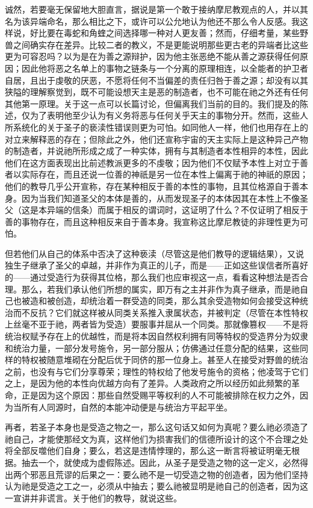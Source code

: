诚然，若要毫无保留地大胆直言，据说是第一个敢于接纳摩尼教观点的人，并以其名为该异端命名，那么相比之下，或许可以公允地认为他还不那么令人反感。我这样说，好比要在毒蛇和角蝰之间选择哪一种对人更友善；然而，仔细考量，某些野兽之间确实存在差异。比较二者的教义，不是更能说明那些更古老的异端者比这些更为可容忍吗？以为是在为善之源辩护，因为他主张恶绝不能从善之源获得任何原因；因此他将恶之名单上的事物之链条与一个分离的原理相连，以全能者的护卫者自居，且出于虔敬的厌恶，不愿将任何不当偏差的责任归咎于善之源；却没有以其狭隘的理解察觉到，既不可能设想天主是恶的制造者，也不可能在祂之外还有任何其他第一原理。关于这一点可以长篇讨论，但偏离我们当前的目的。我们提及的陈述，仅为了表明他至少认为有义务将恶与任何关乎天主的事物分开。然而，这些人所系统化的关于圣子的亵渎性错误则更为可怕。如同他人一样，他们也用存在上的对立来解释恶的存在；但除此之外，他们还宣称宇宙的天主实际上是这种异己产物的制造者，并说祂所形成之成了一种实体，拥有与其制造者本性相异的本性，因此他们在这方面表现出比前述教派更多的不虔敬；因为他们不仅赋予本性上对立于善者以实际存在，而且还说一位善的神祇是另一位在本性上偏离于祂的神祇的原因；他们的教导几乎公开宣称，存在某种相反于善的本性的事物，且其位格源自于善本身。因为当我们知道圣父的本体是善的，从而发现圣子的本体因其在本性上不像圣父（这是本异端的信条）而属于相反的谓词时，这证明了什么？不仅证明了相反于善的事物存在，而且这种相反来自于善本身。我宣称这比摩尼教徒的非理性更为可怕。\par

但若他们从自己的体系中否决了这种亵渎（尽管这是他们教导的逻辑结果），又说独生子继承了圣父的卓越，并非作为真正的儿子，而是——正如这些误信者所喜好的——通过受造行为获得其位格，那么我们也应审视这一点，看看这种想法是否合理。那么，若我们承认他们所想的属实，即万有之主并非作为真子继承，而是祂自己也被造和被创造，却统治着一群受造的同类，那么其余受造物如何会接受这种统治而不反抗？它们就这样被从同类关系推入隶属状态，并被判定（尽管在本性特权上丝毫不亚于祂，两者皆为受造）要服事并屈从一个同类。那就像篡权——不是将统治权赋予存在上的优越性，而是将本因自然权利拥有同等特权的受造界分为奴隶和统治力量，一部分发号施令，另一部分服从；仿佛通过任意分配的结果，这些同样的特权被随意堆砌在分配后优于同侪的那一位身上。甚至人在接受对野兽的统治之前，也没有与它们分享尊荣；理性的特权给了他发号施令的资格；他凌驾于它们之上，是因为他的本性向优越方向有了差异。人类政府之所以经历如此频繁的革命，正是因为这个原因：那些自然受赐平等权利的人不可能被排除在权力之外，因为当所有人同源时，自然的本能冲动便是与统治方平起平坐。\par

再者，若圣子本身也是受造之物之一，那么这句话又如何为真呢？要么祂必须造了祂自己，才能使那经文为真，这样他们为损害我们的信德所设计的这个不合理之处将全部反噬他们自身；要么，若这是违情悖理的，那么这一断言将被证明毫无根据。抽去一个，就使成为虚假陈述。因此，从圣子是受造之物的这一定义，必然得出两个邪恶且荒谬的后果之一：要么祂不是一切受造之物的创造者，因为他们坚持认为祂是受造之工之一，必须从中抽去；要么祂被显明是祂自己的创造者，因为这一宣讲并非谎言。关于他们的教导，就说这些。\par

